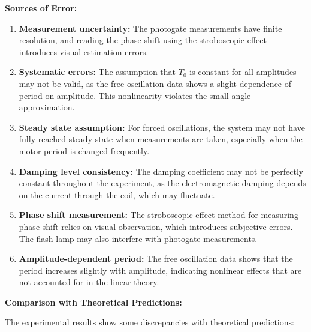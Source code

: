 \documentclass[12pt]{article}
\begin{document}
\textbf{Sources of Error:}
\begin{enumerate}[leftmargin=*]
\item \textbf{Measurement uncertainty:} The photogate measurements have finite resolution, and reading the phase shift using the stroboscopic effect introduces visual estimation errors.

\item \textbf{Systematic errors:} The assumption that $T_0$ is constant for all amplitudes may not be valid, as the free oscillation data shows a slight dependence of period on amplitude. This nonlinearity violates the small angle approximation.

\item \textbf{Steady state assumption:} For forced oscillations, the system may not have fully reached steady state when measurements are taken, especially when the motor period is changed frequently.

\item \textbf{Damping level consistency:} The damping coefficient may not be perfectly constant throughout the experiment, as the electromagnetic damping depends on the current through the coil, which may fluctuate.

\item \textbf{Phase shift measurement:} The stroboscopic effect method for measuring phase shift relies on visual observation, which introduces subjective errors. The flash lamp may also interfere with photogate measurements.

\item \textbf{Amplitude-dependent period:} The free oscillation data shows that the period increases slightly with amplitude, indicating nonlinear effects that are not accounted for in the linear theory.
\end{enumerate}

\textbf{Comparison with Theoretical Predictions:}

The experimental results show some discrepancies with theoretical predictions:
\end{document}
